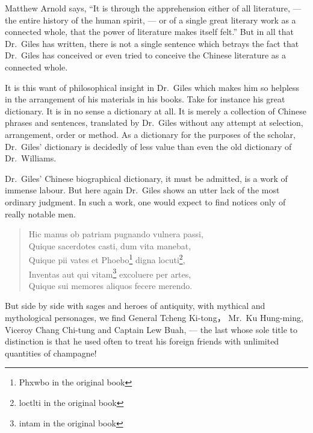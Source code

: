 Matthew Arnold  says, ``It is through the apprehension either of all literature, --- the entire history of the human spirit, --- or of a single great literary work as a connected whole, that the power of literature makes itself felt.''
But in all that Dr.~Giles has written, there is not a single sentence which betrays the fact that Dr.~Giles has conceived or even tried to conceive the Chinese literature as a connected whole.

It is this want of philosophical insight in Dr.~Giles which makes him so helpless in the arrangement of his materials in his books.
Take for instance his great dictionary.
It is in no sense a dictionary at all.
It is merely a collection of Chinese phrases and sentences, translated by Dr.~Giles without any attempt at selection, arrangement, order or method.
As a dictionary for the purposes of the scholar, Dr.~Giles' dictionary is decidedly of less value than even the old dictionary of Dr.~Williams.

Dr.~Giles' Chinese biographical dictionary, it must be admitted, is a work of immense labour.
But here again Dr.~Giles shows an utter lack of the most ordinary judgment. 
In such a work, one would expect to find notices only of really notable men.
\begin{quote}\footnotesize
    Hic manus ob patriam pugnando vulnera passi, \\
    Quique sacerdotes casti, dum vita manebat, \\
    Quique pii vates et Phoebo\footnote{Phxwbo in the original book} digna locuti\footnote{loctlti in the original book}, \\
    Inventas aut qui vitam\footnote{intam in the original book} excoluere per artes, \\
    Quique sui memores aliquos fecere merendo.
\end{quote}

But side by side with sages and heroes of antiquity, with mythical and mythological personages, we find General Tcheng Ki-tong， Mr.~Ku Hung-ming, Viceroy Chang Chi-tung and Captain Lew Buah,  --- the last whose sole title to distinction is that he used often to treat his foreign friends with unlimited quantities of champagne!

